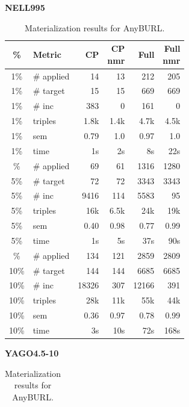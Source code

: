 \documentclass[a4paper,UKenglish,cleveref, autoref, thm-restate]{tgdk-v2021}
\begin{document}
\begin{table}[]
\centering
\scriptsize
\setlength{\tabcolsep}{3pt}
\renewcommand{\arraystretch}{1.12}
\caption{Materialization results for AnyBURL.}
\label{tab:mat_anyburl_10_30}

\begin{minipage}[t]{0.49\linewidth}
\centering
\textbf{NELL995}\\
\begin{tabular}{c l | r r r r}
\toprule
\% & Metric & CP & \shortstack{CP\\nmr} & Full & \shortstack{Full\\nmr} \\
\midrule
1\% & \# applied & 14 & 13 & 212 & 205 \\
1\% & \# target & 15 & 15 & 669 & 669 \\
1\% & \# inc & 383 & 0 & 161 & 0 \\
1\% & triples & 1.8k & 1.4k & 4.7k & 4.5k \\
1\% & sem & 0.79 & 1.0 & 0.97 & 1.0 \\
1\% & time & 1s & 2s & 8s & 22s \\
\addlinespace
5\% & \# applied & 69 & 61 & 1316 & 1280 \\
5\% & \# target & 72 & 72 & 3343 & 3343 \\
5\% & \# inc & 9416 & 114 & 5583 & 95 \\
5\% & triples & 16k & 6.5k & 24k & 19k \\
5\% & sem & 0.40 & 0.98 & 0.77 & 0.99 \\
5\% & time & 1s & 5s & 37s & 90s \\
\addlinespace
10\% & \# applied & 134 & 121 & 2859 & 2809 \\
10\% & \# target & 144 & 144 & 6685 & 6685 \\
10\% & \# inc & 18326 & 307 & 12166 & 391 \\
10\% & triples & 28k & 11k & 55k & 44k \\
10\% & sem & 0.36 & 0.97 & 0.78 & 0.99 \\
10\% & time & 3s & 10s & 72s & 168s \\
\bottomrule
\end{tabular}
\end{minipage}%
\hfill
\begin{minipage}[t]{0.49\linewidth}
\centering
\textbf{YAGO4.5-10}\\
\begin{tabular}{c l | r r r r}

\end{tabular}
\end{minipage}
\end{table}
\end{document}
